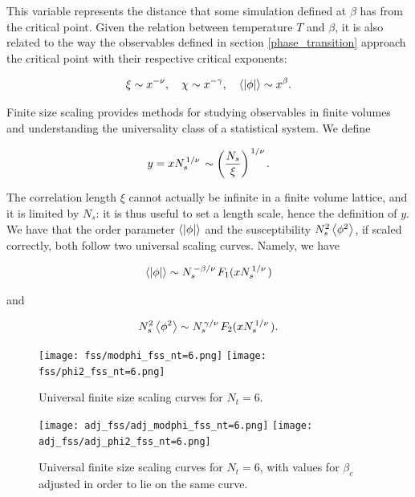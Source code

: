 \documentclass[reqno,12pt]{article}
\numberwithin{equation}{section}
\begin{document}
This variable represents the distance that some simulation defined at $\beta$ has from the critical point. Given
the relation between temperature $T$ and $\beta$, it is also related to the way the observables
defined in section \ref{phase_transition} approach the critical point with their respective critical exponents:

\begin{equation}
	\xi \sim x^{-\nu} \qc \chi \sim x^{-\gamma} \qc \expval{|\phi|} \sim x^{\beta}.
\end{equation}

Finite size scaling provides methods for studying observables in finite volumes and understanding the 
universality class of a statistical system. We define

\begin{equation}
	y = x N_s^{\flatfrac{1}{\nu}} \sim \qty(\frac{N_s}{\xi})^{\flatfrac{1}{\nu}}.
\end{equation}

The correlation length $\xi$ cannot actually be infinite in a finite volume lattice, and it is limited by $N_s$: 
it is thus useful to set a length scale, hence the definition of $y$. We have that the order parameter
$\expval{|\phi|}$ and the susceptibility $N_s^2 \expval{\phi^2}$, if scaled correctly, both follow
two universal scaling curves. Namely, we have

\begin{equation}
	\expval{|\phi|} \sim N_s^{\flatfrac{-\beta}{\nu}} F_1(x N_s^{\flatfrac{1}{\nu}})
\end{equation}

and 

\begin{equation}
	N_s^2 \expval{\phi^2} \sim N_s^{\flatfrac{\gamma}{\nu}} F_2(x N_s^{\flatfrac{1}{\nu}}).
\end{equation}

\begin{figure}[h]
	\centering
	\texttt{[image: fss/modphi\_fss\_nt=6.png]}
	\texttt{[image: fss/phi2\_fss\_nt=6.png]}
	\caption[Finite size scaling curve for $N_t = 6$]{Universal finite size scaling curves for $N_t = 6$.}
\label{fig:fss}
\end{figure}

\begin{figure}[h]
	\centering
	\texttt{[image: adj\_fss/adj\_modphi\_fss\_nt=6.png]}
	\texttt{[image: adj\_fss/adj\_phi2\_fss\_nt=6.png]}
	\caption[Adjusted finite size scaling curves for $N_t = 6$]{Universal finite size scaling curves for $N_t = 6$,
	with values for $\beta_c$ adjusted in order to lie on the same curve.}
\label{fig:adj_fss}
\end{figure}
\end{document}

